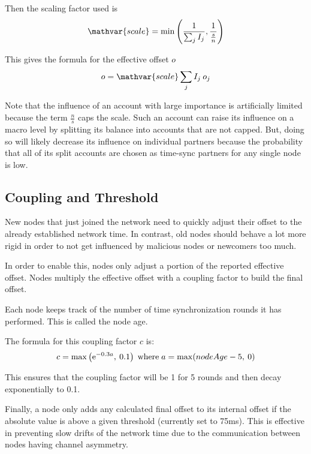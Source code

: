 Then the scaling factor used is
$$ \mathvar{scale} = \min\left(\frac{1}{\sum_j I_j}, \frac{1}{\frac{s}{n}}\right)$$

This gives the formula for the effective offset $o$
$$ o = \mathvar{scale} \sum_j I_j \: o_j$$

Note that the influence of an account with large importance is artificially limited because the term $\frac{n}{s} $ caps the scale.
Such an account can raise its influence on a macro level by splitting its balance into accounts that are not capped.
But, doing so will likely decrease its influence on individual partners because the probability that all of its split accounts are chosen as time-sync partners for any single node is low.

\subsection{Coupling and Threshold}

New nodes that just joined the network need to quickly adjust their offset to the already established network time.
In contrast, old nodes should behave a lot more rigid in order to not get influenced by malicious nodes or newcomers too much.

In order to enable this, nodes only adjust a portion of the reported effective offset.
Nodes multiply the effective offset with a coupling factor to build the final offset.

Each node keeps track of the number of time synchronization rounds it has performed.
This is called the node age.

The formula for this coupling factor $c$ is:
$$c = \max\left(\mathrm{e}^{-0.3a},\: 0.1\right) \; \text{where} \; a = \max(nodeAge - 5,\: 0)$$

This ensures that the coupling factor will be 1 for 5 rounds and then decay exponentially to 0.1.

\begin{figure}
\end{figure}

Finally, a node only adds any calculated final offset to its internal offset if the absolute value is above a given threshold (currently set to 75ms).
This is effective in preventing slow drifts of the network time due to the communication between nodes having channel asymmetry.
